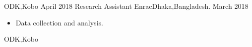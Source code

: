 \begin{experiences}
{\begin{itemize}
                      \end{itemize}
                    }
                    {ODK,Kobo}
  \emptySeparator
  \experience
  {April 2018}       {Research Assistant }{Enrac}{Dhaka,Bangladesh.}
  {March 2018}      
                    {
                      \begin{itemize}
                        \item Data collection and analysis. 
                        
                      \end{itemize}
                    }
                    {ODK,Kobo}
  \emptySeparator

\end{experiences}
